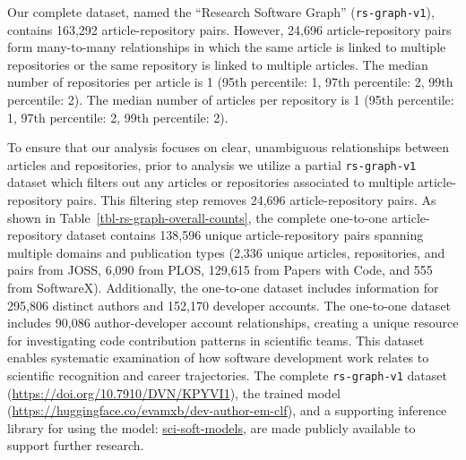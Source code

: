 \documentclass[
  number,
  3p,
  onecolumn]{elsarticle}
\begin{document}
Our complete dataset, named the ``Research Software Graph''
(\texttt{rs-graph-v1}), contains 163,292 article-repository pairs.
However, 24,696 article-repository pairs form many-to-many relationships
in which the same article is linked to multiple repositories or the same
repository is linked to multiple articles. The median number of
repositories per article is 1 (95th percentile: 1, 97th percentile: 2,
99th percentile: 2). The median number of articles per repository is 1
(95th percentile: 1, 97th percentile: 2, 99th percentile: 2).

To ensure that our analysis focuses on clear, unambiguous relationships
between articles and repositories, prior to analysis we utilize a
partial \texttt{rs-graph-v1} dataset which filters out any articles or
repositories associated to multiple article-repository pairs. This
filtering step removes 24,696 article-repository pairs. As shown in
Table~\ref{tbl-rs-graph-overall-counts}, the complete one-to-one
article-repository dataset contains 138,596 unique article-repository
pairs spanning multiple domains and publication types (2,336 unique
articles, repositories, and pairs from JOSS, 6,090 from PLOS, 129,615
from Papers with Code, and 555 from SoftwareX). Additionally, the
one-to-one dataset includes information for 295,806 distinct authors and
152,170 developer accounts. The one-to-one dataset includes 90,086
author-developer account relationships, creating a unique resource for
investigating code contribution patterns in scientific teams. This
dataset enables systematic examination of how software development work
relates to scientific recognition and career trajectories. The complete
\texttt{rs-graph-v1} dataset (\url{https://doi.org/10.7910/DVN/KPYVI1}),
the trained model
(\url{https://huggingface.co/evamxb/dev-author-em-clf}), and a
supporting inference library for using the model:
\href{https://github.com/evamaxfield/sci-soft-models}{sci-soft-models},
are made publicly available to support further research.
\end{document}
